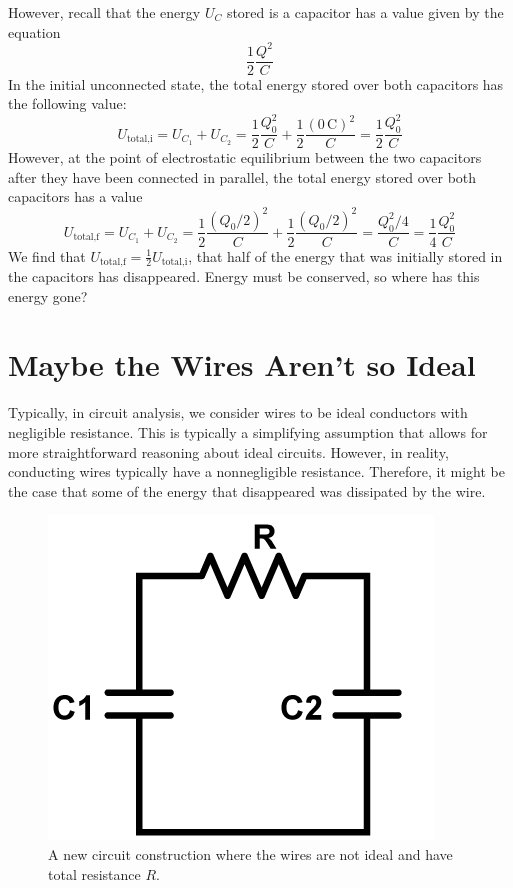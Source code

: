 \documentclass{article}
\newcommand{\unit}[1]{\ensuremath{\, \mathrm{#1}}}
\begin{document}
However, recall that the energy $U_C$ stored is a capacitor has a value given by the equation
\[
\frac{1}{2} \frac{Q^2}{C}
\]
In the initial unconnected state, the total energy stored over both capacitors has the following value:
\[
U_{\text{total,i}} = U_{C_1} + U_{C_2} = \frac{1}{2} \frac{Q_0^2}{C} + \frac{1}{2} \frac{(0 \unit{C})^2}{C} = \frac{1}{2} \frac{Q_0^2}{C}
\]
However, at the point of electrostatic equilibrium between the two capacitors after they have been connected in parallel, the total energy stored over both capacitors has a value
\[
U_{\text{total,f}} = U_{C_1} + U_{C_2} = \frac{1}{2} \frac{(Q_0 / 2)^2}{C} + \frac{1}{2} \frac{(Q_0 / 2)^2}{C} =  \frac{Q_0^2 / 4}{C} = \frac{1}{4} \frac{Q_0^2}{C}
\]
We find that $U_{\text{total,f}} = \frac{1}{2}U_{\text{total,i}}$, that half of the energy that was initially stored in the capacitors has disappeared.  Energy must be conserved, so where has this energy gone?

\section{Maybe the Wires Aren't so Ideal}

Typically, in circuit analysis, we consider wires to be ideal conductors with negligible resistance.  This is typically a simplifying assumption that allows for more straightforward reasoning about ideal circuits.  However, in reality, conducting wires typically have a nonnegligible resistance.  Therefore, it might be the case that some of the energy that disappeared was dissipated by the wire.

\begin{figure}[h!]
\centering
\includegraphics[scale=0.2]{2.png} 
\caption{A new circuit construction where the wires are not ideal and have total resistance $R$.}
\end{figure}
\end{document}
